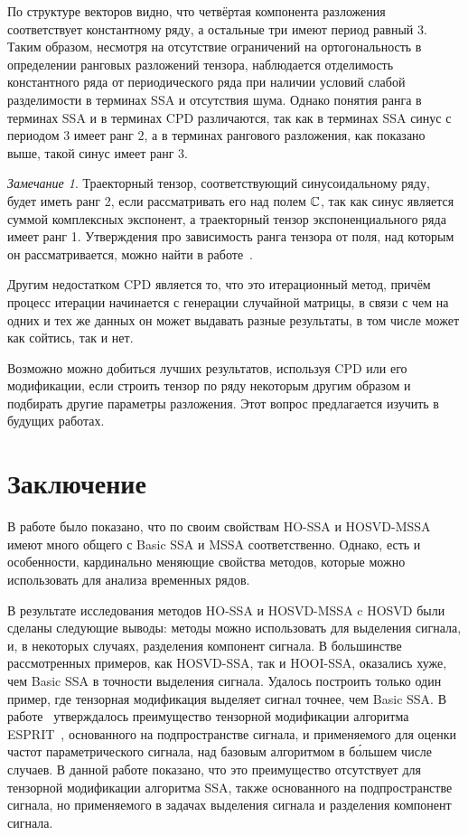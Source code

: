 \documentclass[specialist,
    substylefile = spbu.rtx,
    subf,href,colorlinks=true, 12pt]{disser}
\theoremstyle{plain}
\theoremstyle{definition}
\theoremstyle{remark}
\newtheorem*{remark}{Замечание}
\begin{document}
    По структуре векторов видно, что четвёртая компонента разложения соответствует константному ряду, а остальные три имеют период равный $3$.
    Таким образом, несмотря на отсутствие ограничений на ортогональность в определении ранговых разложений тензора, наблюдается
    отделимость константного ряда от периодического ряда при наличии условий слабой разделимости в терминах SSA и отсутствия
    шума.
    Однако понятия ранга в терминах SSA и в терминах CPD различаются, так как в терминах SSA синус с периодом $3$ имеет ранг $2$, а в
    терминах рангового разложения, как показано выше, такой синус имеет ранг $3$.
    \begin{remark}
        Траекторный тензор, соответствующий синусоидальному ряду, будет иметь ранг 2, если рассматривать его
        над полем $\mathbb{C}$, так как синус является суммой комплексных экспонент, а траекторный тензор экспоненциального
        ряда имеет ранг 1.
        Утверждения про зависимость ранга тензора от поля, над которым он рассматривается, можно найти в
        работе~\cite{tensors-bg}.
    \end{remark}

    Другим недостатком CPD является то, что это итерационный метод, причём процесс итерации начинается
    с генерации случайной матрицы, в связи с чем на одних и тех же данных он может выдавать разные результаты, в том
    числе может как сойтись, так и нет.

    Возможно можно добиться лучших результатов, используя CPD или его модификации, если строить тензор по ряду
    некоторым другим образом и подбирать другие параметры разложения.
    Этот вопрос предлагается изучить в будущих работах.
    \newpage


    \section{Заключение}\label{sec:conclusion}
    В работе было показано, что по своим свойствам HO-SSA и HOSVD-MSSA имеют много общего 
    с Basic SSA и MSSA соответственно.
    Однако, есть и особенности, кардинально меняющие свойства методов, которые можно использовать для анализа временных рядов.

    В результате исследования методов HO-SSA и HOSVD-MSSA c HOSVD были сделаны следующие выводы:
    методы можно использовать для выделения сигнала, и, в некоторых случаях, разделения компонент сигнала.
    В большинстве рассмотренных примеров, как HOSVD-SSA, так и HOOI-SSA, оказались хуже,
    чем Basic SSA в точности выделения сигнала.
    Удалось построить только один пример, где тензорная модификация выделяет сигнал точнее, чем Basic SSA.
    В работе~\cite{hosvd-hooi-separation} утверждалось преимущество тензорной модификации алгоритма 
    ESPRIT~\cite{esprit}, основанного на подпространстве сигнала, и применяемого для оценки частот
    параметрического сигнала, над базовым алгоритмом в б\'{о}льшем числе случаев.
    В данной работе показано, что это преимущество отсутствует для тензорной модификации алгоритма SSA, также основанного на подпространстве сигнала, но применяемого в задачах выделения сигнала и разделения компонент сигнала.
\end{document}
